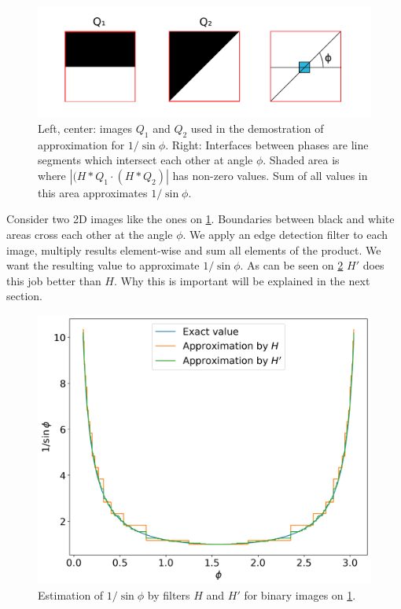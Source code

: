 \documentclass[reprint,amsmath,amssymb,aps,pre,showkeys,showpacs]{revtex4-1}
\begin{document}
\begin{figure}
  \centering
  \includegraphics[width=0.8\linewidth]{images/experiment-setup.png}
  \caption[]{Left, center: images $Q_1$ and $Q_2$ used in the demostration of
    approximation for $1 / \sin \phi$. Right: Interfaces between phases are
    line segments which intersect each other at angle $\phi$. Shaded area is
    where $|(H*Q_1\cdot(H*Q_2)|$ has non-zero values. Sum of all values in this
    area approximates $1 / \sin \phi$.}
  \label{fig:experiment-setup}
\end{figure}
Consider two 2D images like the ones on \cref{fig:experiment-setup}. Boundaries
between black and white areas cross each other at the angle $\phi$. We apply an
edge detection filter to each image, multiply results element-wise and sum all
elements of the product. We want the resulting value to approximate
$1/\sin \phi$. As can be seen on \cref{fig:filter-comparison} $H'$ does this job
better than $H$. Why this is important will be explained in the next section.
\begin{figure}
  \centering
  \includegraphics[width=0.8\linewidth]{images/filter-comparison.png}
  \caption[]{Estimation of $1/\sin\phi$ by filters $H$ and $H'$ for binary
    images on \cref{fig:experiment-setup}.}
  \label{fig:filter-comparison}
\end{figure}
\end{document}
